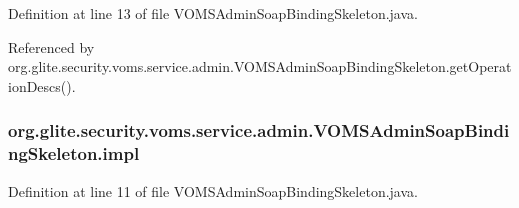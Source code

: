 Definition at line 13 of file VOMSAdminSoapBindingSkeleton.java.



Referenced by org.glite.security.voms.service.admin.VOMSAdminSoapBindingSkeleton.getOperationDescs().

\hypertarget{classorg_1_1glite_1_1security_1_1voms_1_1service_1_1admin_1_1VOMSAdminSoapBindingSkeleton_a25375d5138b17d662d53925796daaf74}{
\subsubsection[{impl}]{ {\bf org.glite.security.voms.service.admin.VOMSAdminSoapBindingSkeleton.impl}}}
\label{classorg_1_1glite_1_1security_1_1voms_1_1service_1_1admin_1_1VOMSAdminSoapBindingSkeleton_a25375d5138b17d662d53925796daaf74}


Definition at line 11 of file VOMSAdminSoapBindingSkeleton.java.



